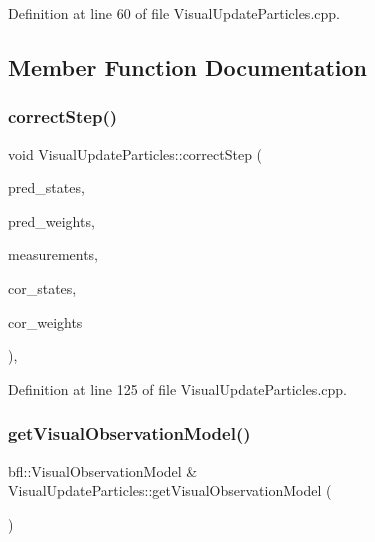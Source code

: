Definition at line 60 of file Visual\+Update\+Particles.\+cpp.



\subsection{Member Function Documentation}
\mbox{\label{classVisualUpdateParticles_ac0ed3c0a2ccab6cbc65a5f83fa834483}} 
\subsubsection{\texorpdfstring{correct\+Step()}{correctStep()}}
{\footnotesize\ttfamily void Visual\+Update\+Particles\+::correct\+Step (\begin{DoxyParamCaption}\item[{const Eigen\+::\+Ref$<$ const Eigen\+::\+Matrix\+Xf $>$ \&}]{pred\+\_\+states,  }\item[{const Eigen\+::\+Ref$<$ const Eigen\+::\+Vector\+Xf $>$ \&}]{pred\+\_\+weights,  }\item[{cv\+::\+Input\+Array}]{measurements,  }\item[{Eigen\+::\+Ref$<$ Eigen\+::\+Matrix\+Xf $>$}]{cor\+\_\+states,  }\item[{Eigen\+::\+Ref$<$ Eigen\+::\+Vector\+Xf $>$}]{cor\+\_\+weights }\end{DoxyParamCaption})\hspace{0.3cm}{\ttfamily [override]}, {\ttfamily [protected]}}



Definition at line 125 of file Visual\+Update\+Particles.\+cpp.

\mbox{\label{classVisualUpdateParticles_a34f3b5665eff632890713db818d1995a}} 
\subsubsection{\texorpdfstring{get\+Visual\+Observation\+Model()}{getVisualObservationModel()}}
{\footnotesize\ttfamily bfl\+::\+Visual\+Observation\+Model \& Visual\+Update\+Particles\+::get\+Visual\+Observation\+Model (\begin{DoxyParamCaption}{ }\end{DoxyParamCaption})\hspace{0.3cm}{\ttfamily [override]}}



